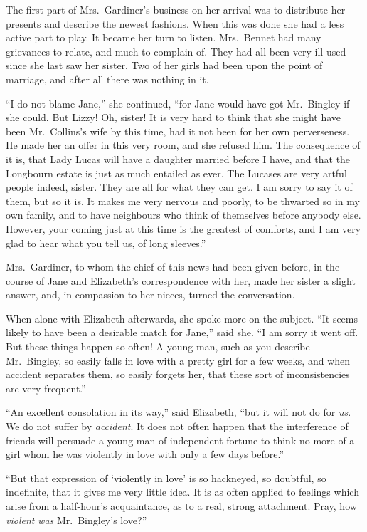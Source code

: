 \documentclass[12pt,english]{book}
\begin{document}
The first part of Mrs.\ Gardiner's business on her arrival was to
distribute her presents and describe the newest fashions. When this
was done she had a less active part to play. It became her turn to
listen. Mrs.\ Bennet had many grievances to relate, and much to complain
of. They had all been very ill-used since she last saw her sister.
Two of her girls had been upon the point of marriage, and after all
there was nothing in it.

{}``I do not blame Jane,'' she continued, {}``for Jane would have
got Mr.\ Bingley if she could. But Lizzy! Oh, sister! It is very
hard to think that she might have been Mr.\ Collins's wife by this
time, had it not been for her own perverseness. He made her an offer
in this very room, and she refused him. The consequence of it is,
that Lady Lucas will have a daughter married before I have, and that
the Longbourn estate is just as much entailed as ever. The Lucases
are very artful people indeed, sister. They are all for what they
can get. I am sorry to say it of them, but so it is. It makes me very
nervous and poorly, to be thwarted so in my own family, and to have
neighbours who think of themselves before anybody else. However, your
coming just at this time is the greatest of comforts, and I am very
glad to hear what you tell us, of long sleeves.''

Mrs.\ Gardiner, to whom the chief of this news had been given before,
in the course of Jane and Elizabeth's correspondence with her, made
her sister a slight answer, and, in compassion to her nieces, turned
the conversation.

When alone with Elizabeth afterwards, she spoke more on the subject.
{}``It seems likely to have been a desirable match for Jane,'' said
she. {}``I am sorry it went off. But these things happen so often!
A young man, such as you describe Mr.\ Bingley, so easily falls in
love with a pretty girl for a few weeks, and when accident separates
them, so easily forgets her, that these sort of inconsistencies are
very frequent.''

{}``An excellent consolation in its way,'' said Elizabeth, {}``but
it will not do for \textit{us}. We do not suffer by \textit{accident}.
It does not often happen that the interference of friends will persuade
a young man of independent fortune to think no more of a girl whom
he was violently in love with only a few days before.''

{}``But that expression of `violently in love' is so hackneyed, so
doubtful, so indefinite, that it gives me very little idea. It is
as often applied to feelings which arise from a half-hour's acquaintance,
as to a real, strong attachment. Pray, how \textit{violent} \textit{was}
Mr.\ Bingley's love?''\ 
\end{document}
